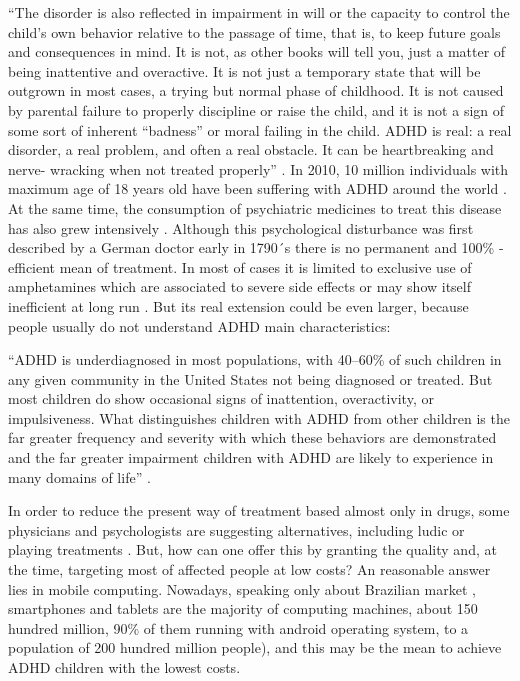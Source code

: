 ``The disorder is also reflected in impairment in will or the capacity to control the child’s own behavior relative to the passage of time, that is, to keep future goals and consequences in mind. It is not, as other books will tell you, just a matter of being inattentive and overactive. It is not just a temporary state that will be outgrown in most cases, a trying but normal phase of childhood. It is not caused by parental failure to properly discipline or raise the child, and it is not a sign of some sort of inherent ``badness'' or moral failing in the child. ADHD is real: a real disorder, a real problem, and often a real obstacle. It can be heartbreaking and nerve- wracking when not treated properly'' \citep{RBarkley}. In 2010, 10 million individuals with maximum age of 18 years old have been suffering with ADHD around the world \citep{Psychoanalytic}. At the same time, the consumption of psychiatric medicines to treat this disease has also grew intensively  \citep{Psychoanalytic}. Although this psychological disturbance was first described by a German doctor early in 1790´s there is no permanent and 100\% -efficient mean of treatment. In most of cases it is limited to exclusive use of amphetamines which are associated to severe side effects or may show itself inefficient at long run  \citep{Psychoanalytic}. But its real extension  could be even larger, because people usually  do not understand ADHD main characteristics:

``ADHD is underdiagnosed in most populations, with 40–60\% of such children in any given community in the United States not being diagnosed or treated. But most children do show occasional signs of inattention, overactivity, or impulsiveness. What distinguishes children with ADHD from other children is the far greater frequency and severity with which these behaviors are demonstrated and the far greater impairment children with ADHD are likely to experience in many domains of life'' \citep{RBarkley}.

In order to reduce the present way of treatment based almost only in drugs, some physicians and psychologists are suggesting alternatives, including ludic or playing treatments \citep{Psychoanalytic, brainGames}. But, how can one offer this by granting the quality and, at the time, targeting most of affected people at low costs? An reasonable answer lies in mobile computing. Nowadays, speaking only about Brazilian market \citep{idcTablets}, smartphones and tablets are the majority of computing machines, about 150 hundred million, 90\% of them running with android operating system, to a population of 200 hundred million people\citep{idcTablets}), and this may be the mean to achieve ADHD children with the lowest costs. 

